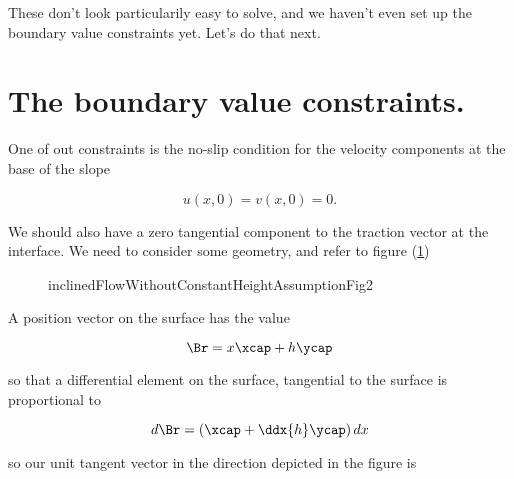 These don't look particularily easy to solve, and we haven't even set up the boundary value constraints yet.  Let's do that next.

\section{The boundary value constraints.}

%
One of out constraints is the no-slip condition for the velocity components at the base of the slope

\begin{equation}\label{eqn:inclinedFlowWithoutConstantHeightAssumption:80}
\boxed{
u(x, 0) = v(x, 0) = 0.
}
\end{equation}

We should also have a zero tangential component to the traction vector at the interface.  We need to consider some geometry, and refer to figure (\ref{fig:inclinedFlowWithoutConstantHeightAssumption:inclinedFlowWithoutConstantHeightAssumptionFig3})

\begin{figure}[htp]
   \centering
   \def\svgwidth{0.7\columnwidth}
   
   \caption{inclinedFlowWithoutConstantHeightAssumptionFig2}
\label{fig:inclinedFlowWithoutConstantHeightAssumption:inclinedFlowWithoutConstantHeightAssumptionFig3}
\end{figure}

A position vector on the surface has the value

\begin{equation}\label{eqn:inclinedFlowWithoutConstantHeightAssumption:100}
\Br = x \xcap + h \ycap
\end{equation}

so that a differential element on the surface, tangential to the surface is proportional to

\begin{equation}\label{eqn:inclinedFlowWithoutConstantHeightAssumption:120}
d\Br = \left( \xcap + \ddx{h} \ycap \right) dx
\end{equation}

so our unit tangent vector in the direction depicted in the figure is

